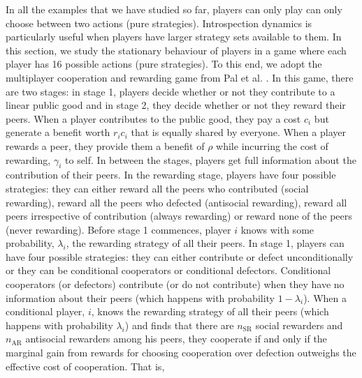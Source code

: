 \documentclass[11pt]{article}
\theoremstyle{plainCl1}
\theoremstyle{plainCl2}
\begin{document}
In all the examples that we have studied so far, players can only play can only choose between two actions (pure strategies). Introspection dynamics is particularly useful when players have larger strategy sets available to them. In this section, we study the stationary behaviour of players in a game where each player has 16 possible actions (pure strategies). To this end, we adopt the multiplayer cooperation and rewarding game from Pal et al. \cite{Pal:NatCom:2022}. In this game, there are two stages: in stage 1, players decide whether or not they contribute to a linear public good and in stage 2, they decide whether or not they reward their peers. When a player contributes to the public good, they pay a cost $c_i$ but generate a benefit worth $r_i c_i$ that is equally shared by everyone. When a player rewards a peer, they provide them a benefit of $\rho$ while incurring the cost of rewarding, $\gamma_i$ to self. In between the stages, players get full information about the contribution of their peers. In the rewarding stage, players have four possible strategies: they can either reward all the peers who contributed (social rewarding), reward all the peers who defected (antisocial rewarding), reward all peers irrespective of contribution (always rewarding) or reward none of the peers (never rewarding). Before stage 1 commences, player $i$ knows with some probability, $\lambda_i$, the rewarding strategy of all their peers. In stage 1, players can have four possible strategies: they can either contribute or defect unconditionally or they can be conditional cooperators or conditional defectors. Conditional cooperators (or defectors) contribute (or do not contribute) when they have no information about their peers (which happens with probability $1 - \lambda_i$). When a conditional player, $i$, knows the rewarding strategy of all their peers (which happens with probability $\lambda_i$) and finds that there are $n_{\mathrm{SR}}$ social rewarders and $n_{\mathrm{AR}}$ antisocial rewarders among his peers, they cooperate if and only if the marginal gain from rewards for choosing cooperation over defection outweighs the effective cost of cooperation. That is, 
\end{document}
